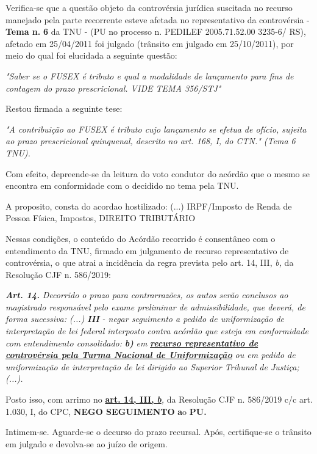 \documentclass[12pt]{article}
\begin{document}
\justifying
\noindent Verifica-se que a questão objeto da controvérsia jurídica suscitada no recurso manejado pela parte recorrente esteve afetada no representativo da controvérsia - \textbf{Tema n. }\textbf{6} da TNU - (PU no processo n. PEDILEF 2005.71.52.00 3235-6/ RS),  afetado em 25/04/2011 foi julgado (trânsito em julgado em 25/10/2011), por meio do qual foi elucidada a seguinte questão:

\noindent \textit{"Saber se o FUSEX é tributo e qual a modalidade de lançamento para fins de contagem do prazo prescricional. VIDE TEMA 356/STJ"}

\noindent Restou firmada a seguinte tese:

\noindent \textit{"A contribuição ao FUSEX é tributo cujo lançamento se efetua de ofício, sujeita ao prazo prescricional quinquenal, descrito no art. 168, I, do CTN." (Tema 6 TNU).}

\noindent Com efeito, depreende-se da leitura do voto condutor do acórdão que o mesmo se encontra em conformidade com o decidido no  tema pela TNU.

\noindent A proposito, consta do acordao hostilizado: (...) IRPF/Imposto de Renda de Pessoa Física, Impostos, DIREITO TRIBUTÁRIO

\noindent Nessas condições, o conteúdo do Acórdão recorrido é consentâneo com o entendimento da TNU, firmado em julgamento de recurso representativo de controvérsia, o que atrai a incidência da regra prevista pelo art. 14, III, \textit{b,} da Resolução CJF n. 586/2019:

\noindent \textit{\textbf{Art. 14.}}\textit{ Decorrido o prazo para contrarrazões, os autos serão conclusos ao magistrado responsável pelo exame preliminar de admissibilidade, que deverá, de forma sucessiva: (...) }\textit{\textbf{III }}\textit{- negar seguimento a pedido de uniformização de interpretação de lei federal interposto contra acórdão que esteja em conformidade com entendimento consolidado: }\textit{\textbf{b)}}\textit{ em }\uline{\textit{\textbf{recurso representativo de controvérsia pela Turma Nacional de Uniformização}}}\textit{ ou em pedido de uniformização de interpretação de lei dirigido ao Superior Tribunal de Justiça;(...).}

\noindent Posto isso, com arrimo no \uline{\textbf{art. 14, III, }}\uline{\textit{\textbf{b}}}\textit{,} da Resolução CJF n. 586/2019 c/c art. 1.030, I, do CPC, \textbf{NEGO SEGUIMENTO }\textbf{a}o\textbf{ PU}\textbf{.}

\noindent Intimem-se. Aguarde-se o decurso do prazo recursal. Após, certifique-se o trânsito em julgado e devolva-se ao juízo de origem.
\end{document}
